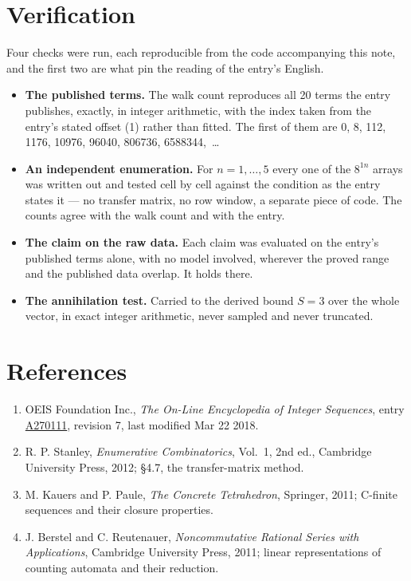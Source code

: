 \documentclass[11pt]{article}
\theoremstyle{definition}
\begin{document}
\section{Verification}

Four checks were run, each reproducible from the code accompanying this note, and the first two are what pin the reading of the entry's English.

\begin{itemize}

\item {\bfseries The published terms.} The walk count reproduces all 20 terms the entry publishes, exactly, in integer arithmetic, with the index taken from the entry's stated offset (1) rather than fitted. The first of them are 0, 8, 112, 1176, 10976, 96040, 806736, 6588344,~\dots

\item {\bfseries An independent enumeration.} For $n = 1,\dots,5$ every one of the $8^{1n}$ arrays was written out and tested cell by cell against the condition as the entry states it --- no transfer matrix, no row window, a separate piece of code. The counts agree with the walk count and with the entry.

\item {\bfseries The claim on the raw data.} Each claim was evaluated on the entry's published terms alone, with no model involved, wherever the proved range and the published data overlap. It holds there.

\item {\bfseries The annihilation test.} Carried to the derived bound $S = 3$ over the whole vector, in exact integer arithmetic, never sampled and never truncated.

\end{itemize}

\section{References}

\begin{enumerate}

\item OEIS Foundation Inc., \emph{The On-Line Encyclopedia of Integer Sequences}, entry \href{https://oeis.org/A270111}{A270111}, revision 7, last modified Mar 22 2018.

\item R. P. Stanley, \emph{Enumerative Combinatorics}, Vol.~1, 2nd ed., Cambridge University Press, 2012; \S4.7, the transfer-matrix method.

\item M. Kauers and P. Paule, \emph{The Concrete Tetrahedron}, Springer, 2011; C-finite sequences and their closure properties.

\item J. Berstel and C. Reutenauer, \emph{Noncommutative Rational Series with Applications}, Cambridge University Press, 2011; linear representations of counting automata and their reduction.

\end{enumerate}
\end{document}
